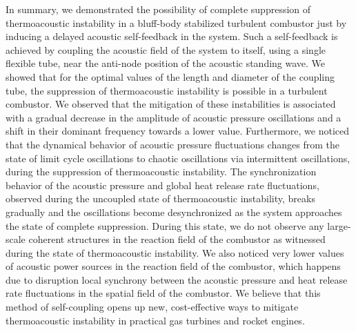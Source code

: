 \documentclass[twocolumn,10pt]{article} %
\begin{document}
In summary, we demonstrated the possibility of complete suppression of thermoacoustic instability in a bluff-body stabilized turbulent combustor just by inducing a delayed acoustic self-feedback in the system. Such a self-feedback is achieved by coupling the acoustic field of the system to itself, using a single flexible tube, near the anti-node position of the acoustic standing wave. We showed that for the optimal values of the length and diameter of the coupling tube, the suppression of thermoacoustic instability is possible in a turbulent combustor. We observed that the mitigation of these instabilities is associated with a gradual decrease in the amplitude of acoustic pressure oscillations and a shift in their dominant frequency towards a lower value. Furthermore, we noticed that the dynamical behavior of acoustic pressure fluctuations changes from the state of limit cycle oscillations to chaotic oscillations via intermittent oscillations, during the suppression of thermoacoustic instability. The synchronization behavior of the acoustic pressure and global heat release rate fluctuations, observed during the uncoupled state of thermoacoustic instability, breaks gradually and the oscillations become desynchronized as the system approaches the state of complete suppression. During this state, we do not observe any large-scale coherent structures in the reaction field of the combustor as witnessed during the state of thermoacoustic instability. We also noticed very lower values of acoustic power sources in the reaction field of the combustor, which happens due to disruption local synchrony between the acoustic pressure and heat release rate fluctuations in the spatial field of the combustor. We believe that this method of self-coupling opens up new, cost-effective ways to mitigate thermoacoustic instability in practical gas turbines and rocket engines. %

 
\end{document}

